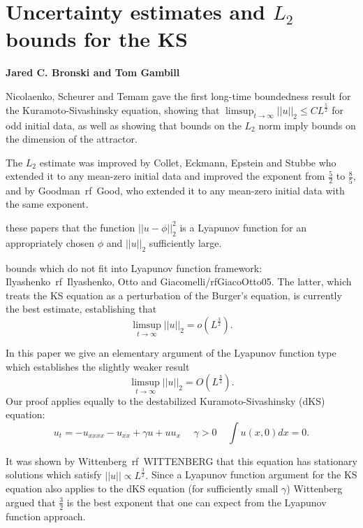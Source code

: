 
\section{Uncertainty estimates and $L_2$ bounds for the KS}

{\bf
Jared C. Bronski
and
Tom Gambill}


Nicolaenko, Scheurer and Temam gave the first long-time
boundedness result for the Kuramoto-Sivashinsky equation, showing that
$\limsup_{t \rightarrow \infty} |\!|u|\!|_2 \le C L^{\frac{5}{2}}$ for
odd initial data, as well as showing that bounds on the $L_2$ norm imply
bounds on the dimension of the attractor.

The $L_2$ estimate was improved by Collet, Eckmann, Epstein and
Stubbe who  extended it to any mean-zero initial data and
improved the exponent from $\frac{5}{2}$ to $\frac{8}{5}$, and by
Goodman~rf~{Good}, who extended it to any mean-zero initial data with the
same exponent.

these papers that the function $|\!|u-\phi|\!|_2^2$ is a Lyapunov
function for an appropriately chosen $\phi$ and $|\!|u|\!|_2$
sufficiently large.

bounds which do not fit into Lyapunov function framework:
Ilyashenko~rf~{Ilyashenko}, Otto  and Giacomelli/rf{GiacoOtto05}. The
latter, which treats the KS equation as a perturbation of the Burger's
equation, is currently the best estimate, establishing that
\[
\limsup_{t \rightarrow \infty} |\!|u|\!|_2 = o(L^{\frac{3}{2}}).
\]

In this paper we give an elementary argument of the Lyapunov function
type which establishes the slightly weaker result
\[
\limsup_{t \rightarrow \infty} |\!|u|\!|_2 = O(L^{\frac{3}{2}}).
\]
Our proof applies equally to the destabilized Kuramoto-Sivashinsky (dKS)
equation:
\[
u_t = -u_{xxxx} - u_{xx} + \gamma  u + u u_x ~~~~~~\gamma > 0 ~~~~~ \int u(x,0)dx = 0.
\]

It was shown by Wittenberg~rf~{WITTENBERG} that this equation
has stationary solutions which satisfy $|\!|u|\!| \propto L^{\frac{3}{2}}.$
Since a Lyapunov function argument for the KS equation also applies
to the dKS equation (for sufficiently small $\gamma$) Wittenberg
argued that $\frac{3}{2}$ is the best exponent that one can expect
from the Lyapunov function approach.

